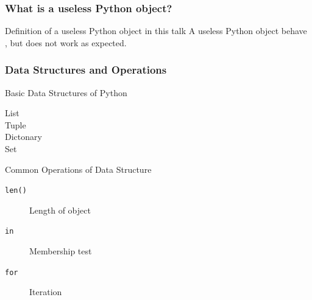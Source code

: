 \documentclass[aspectratio=169,dvipdfmx,12pt,notheorems]{beamer}
\theoremstyle{definition}
\begin{document}
\begin{frame}\frametitle{What is a useless Python object?}

\begin{block}{Definition of a useless Python object in this talk}
A useless Python object behave , but does not work as expected.
\end{block}

\end{frame}

\begin{frame}[fragile]\frametitle{Data Structures and Operations}

\begin{exampleblock}{Basic Data Structures of Python}
\begin{description}
\item[List] \pyv{[1, 2, 3, 4, 5]}
\item[Tuple] 
\item[Dictonary] 
\item[Set] 
\end{description}
\end{exampleblock}

\begin{exampleblock}{Common Operations of Data Structure}
\begin{description}
\item[\texttt{len()}] Length of object
\item[\texttt{in}] Membership test
\item[\texttt{for}] Iteration
\end{description}
\end{exampleblock}

\end{frame}

%
\end{document}
